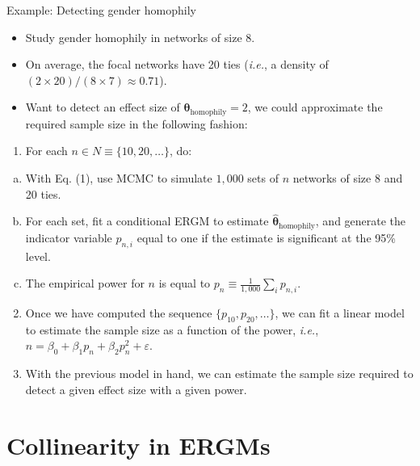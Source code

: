 \documentclass[
  ignorenonframetext,
  aspectratio=169,
]{beamer}
\providecommand{\tightlist}{%
  \setlength{\itemsep}{0pt}\setlength{\parskip}{0pt}}\usepackage{longtable,booktabs,array}
\begin{document}
\begin{frame}{Example: Detecting gender homophily}
\protect\hypertarget{example-detecting-gender-homophily}{}
\begin{itemize}
\item
  Study gender homophily in networks of size 8.
\item
  On average, the focal networks have 20 ties (\textit{i.e.}, a density
  of \((2\times 20)/(8 \times 7) \approx 0.71\)).
\item
  Want to detect an effect size of
  \(\boldsymbol{\theta}_{\mbox{homophily}} = 2\), we could approximate
  the required sample size in the following fashion:
\end{itemize}

\begin{enumerate}
\tightlist
\item
  For each \(n \in N \equiv \{10, 20, \dots\}\), do:
\end{enumerate}

\begin{enumerate}
[a.]
\item
  With Eq. (1), use MCMC to simulate \(1,000\) sets of \(n\) networks of
  size 8 and 20 ties.
\item
  For each set, fit a conditional ERGM to estimate
  \(\widehat{\boldsymbol{\theta}}_{\mbox{homophily}}\), and generate the
  indicator variable \(p_{n, i}\) equal to one if the estimate is
  significant at the 95\% level.
\item
  The empirical power for \(n\) is equal to
  \(p_n \equiv \frac{1}{1,000}\sum_{i}p_{n, i}\).
\end{enumerate}

\begin{enumerate}
\setcounter{enumi}{1}
\item
  Once we have computed the sequence \(\{p_{10}, p_{20}, \dots\}\), we
  can fit a linear model to estimate the sample size as a function of
  the power, \textit{i.e.},
  \(n = \beta_0 + \beta_1 p_n + \beta_2 p_n^2 + \varepsilon\).
\item
  With the previous model in hand, we can estimate the sample size
  required to detect a given effect size with a given power.
\end{enumerate}
\end{frame}

\hypertarget{collinearity-in-ergms}{%
\section{Collinearity in ERGMs}\label{collinearity-in-ergms}}
\end{document}
